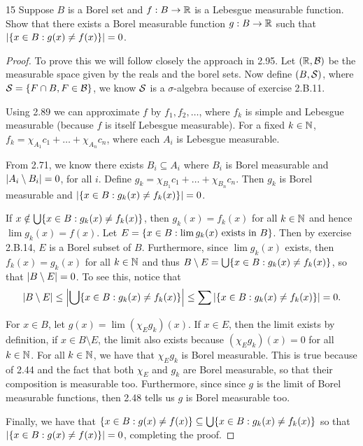 \begin{exercise}{15}
Suppose $B$ is a Borel set and $f: B \to \mathbb{R}$ is a Lebesgue measurable function.
Show that there exists a Borel measurable function $g: B \to \mathbb{R}$ such that $\left\lvert \{x \in B: g(x) \neq f(x)\}\right\rvert = 0$.
\end{exercise}
\begin{proof}
To prove this we will follow closely the approach in 2.95.
Let $(\mathbb{R}, \mathcal{B})$ be the measurable space given by the reals and the borel sets.
Now define $(B, \mathcal{S})$, where $\mathcal{S} = \{F \cap B, F \in \mathcal{B}\}$, we know $\mathcal{S}$ is a $\sigma$-algebra because of exercise 2.B.11.

Using 2.89 we can approximate $f$ by $f_1, f_2, \dots$, where $f_k$ is simple and Lebesgue measurable (because $f$ is itself Lebesgue measurable).
For a fixed $k \in \mathbb{N}$, $f_k = \chi_{A_1}c_1 + \dots + \chi_{A_n}c_n$, where each $A_i$ is Lebesgue measurable.

From 2.71, we know there exists $B_i \subseteq A_i$ where $B_i$ is Borel measurable and $\left\lvert A_i \setminus B_i\right\rvert = 0$, for all $i$.
Define $g_k = \chi_{B_1}c_1 + \dots + \chi_{B_n}c_n$.
Then $g_k$ is Borel measurable and $\left\lvert \{x \in B: g_k(x) \neq f_k(x)\}\right\rvert = 0$.

If $x \notin \bigcup \{x \in B: g_k(x) \neq f_k(x)\}$, then $g_k(x) = f_k(x)$ for all $k \in \mathbb{N}$ and hence $\lim g_k(x) = f(x)$.
Let $E = \{x \in B: \lim g_k(x) \text{ exists in }B\}$.
Then by exercise 2.B.14, $E$ is a Borel subset of $B$.
Furthermore, since $\lim g_k(x)$ exists, then $f_k(x) = g_k(x)$ for all $k \in \mathbb{N}$ and thus $B\setminus E = \bigcup \{x \in B: g_k(x) \neq f_k(x)\}$, so that $\left\lvert B \setminus E\right\rvert = 0$.
To see this, notice that 
\begin{align*}
    \left\lvert B \setminus E\right\rvert \leq \left\lvert \bigcup \{x \in B: g_k(x) \neq f_k(x)\}\right\rvert \leq \sum \left\lvert \{x \in B: g_k(x) \neq f_k(x)\}\right\rvert = 0.
\end{align*}

For $x \in B$, let $g(x) = \lim (\chi_E g_k)(x)$.
If $x \in E$, then the limit exists by definition, if $x \in B\setminus E$, the limit also exists because $(\chi_E g_k)(x) = 0$ for all $k \in \mathbb{N}$.
For all $k \in \mathbb{N}$, we have that $\chi_E g_k$ is Borel measurable.
This is true because of 2.44 and the fact that both $\chi_E$ and $g_k$ are Borel measurable, so that their composition is measurable too.
Furthermore, since since $g$ is the limit of Borel measurable functions, then 2.48 tells us $g$ is Borel measurable too.

Finally, we have that $\{x \in B: g(x) \neq f(x)\} \subseteq \bigcup \{x \in B: g_k(x) \neq f_k(x)\}$ so that $\left\lvert \{x \in B: g(x) \neq f(x)\}\right\rvert = 0$, completing the proof. 

\end{proof} 
